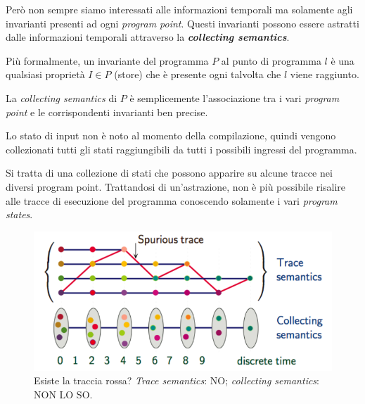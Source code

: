 \documentclass[a4paper, 11pt]{report}
\begin{document}
	Però non sempre siamo interessati alle informazioni temporali ma solamente agli invarianti presenti ad ogni \textit{program point}. Questi invarianti possono essere astratti dalle informazioni temporali attraverso la \textbf{\textit{collecting semantics}}.
	
	Più formalmente, un invariante del programma $P$ al punto di programma $l$ è una qualsiasi proprietà $I\in P$ (store) che è presente ogni talvolta che $l$ viene raggiunto.
	
	La \textit{collecting semantics} di $P$ è semplicemente l'associazione tra i vari \textit{program point} e le corrispondenti invarianti ben precise.
	
	Lo stato di input non è noto al momento della compilazione, quindi vengono collezionati tutti gli stati raggiungibili da tutti i possibili ingressi del programma.
	\newline
	
	Si tratta di una collezione di stati che possono apparire su alcune tracce nei diversi program point. Trattandosi di un'astrazione, non è più possibile risalire alle tracce di esecuzione del programma conoscendo solamente i vari \textit{program states}.
	\begin{figure}[H]
		\centering
		\includegraphics[scale=0.32]{TraceCollect}
		\caption{Esiste la traccia rossa? \textit{Trace semantics}: NO; \textit{collecting semantics}: NON LO SO.}
	\end{figure}
	
	
	
\end{document}
